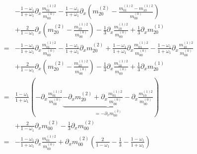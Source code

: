 \documentclass{article}
\begin{document}
\begin{align*}
  &
  - \frac{1 - \omega_1}{1 + \omega_1} \partial_x \frac{m_{01}^{(1)2}}{m_{00}^{(0)}}
  - \frac{1 - \omega_1}{1 + \omega_1} \partial_x \left(m_{20}^{(2)} - \frac{m_{01}^{(1)2} - m_{10}^{(1)2}}{m_{00}^{(0)}}\right)
  \\&
  + \frac{2}{1-\omega_1} \partial_x\left(m_{20}^{(2)} - \frac{m_{10}^{(1)2}}{m_{00}^{(0)}}\right)
  - \frac{1}{3} \partial_x \frac{m_{10}^{(1)2}}{m_{00}^{(0)}}
  + \frac{1}{3} \partial_x m_{20}^{(1)}
  \\=&
  - \frac{1 - \omega_1}{1 + \omega_1} \partial_x \frac{m_{01}^{(1)2}}{m_{00}^{(0)}}
  - \frac{1 - \omega_1}{1 + \omega_1} \partial_x m_{20}^{(2)}
  + \frac{1 - \omega_1}{1 + \omega_1} \partial_x \frac{m_{01}^{(1)2}}{m_{00}^{(0)}}
  - \frac{1 - \omega_1}{1 + \omega_1} \partial_x \frac{m_{10}^{(1)2}}{m_{00}^{(0)}}
  \\&
  + \frac{2}{1-\omega_1}\partial_x \left(m_{20}^{(2)} - \frac{m_{10}^{(1)2}}{m_{00}^{(0)}}\right)
  - \frac{1}{3} \partial_x \frac{m_{10}^{(1)2}}{m_{00}^{(0)}}
  + \frac{1}{3} \partial_x m_{20}^{(1)}
  \\=&
  \frac{1 - \omega_1}{1 + \omega_1}\left(
  - \partial_x \frac{m_{01}^{(1)2}}{m_{00}^{(0)}}
  \underbrace{
  - \partial_x m_{20}^{(2)}
  + \partial_x \frac{m_{01}^{(1)2}}{m_{00}^{(0)}}
  - \partial_x \frac{m_{10}^{(1)2}}{m_{00}^{(0)}}
  }_{=-\partial_x m_{00}^{(2)}}
  \right)
  \\&
  + \frac{2}{1-\omega_1} \partial_x m_{00}^{(2)}
  - \frac{1}{3} \partial_x m_{00}^{(2)}
  \\=&
  - \frac{1 - \omega_1}{1 + \omega_1} \partial_x \frac{m_{01}^{(1)2}}{m_{00}^{(0)}}
  + \partial_x m_{00}^{(2)} \left(\frac{2}{1-\omega_1} - \frac{1}{3} - \frac{1 - \omega_1}{1 + \omega_1}\right)
\end{align*}
\end{document}
